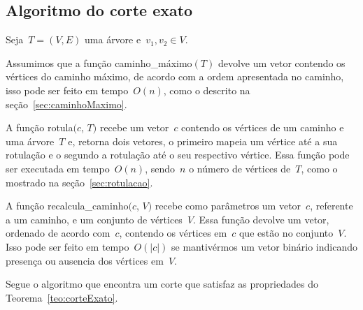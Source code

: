 	\bigskip
	\bigskip
	\bigskip
	\bigskip
	\bigskip

	\subsection{Algoritmo do corte exato}

		Seja~${T=(V,E)}$ uma árvore e~${v_1,v_2\in V}$.

		Assumimos que a função {\sc caminho\_máximo}$(T)$ 
		devolve um vetor contendo os vértices do caminho 
		máximo, de acordo com a ordem apresentada no caminho, 
		isso pode ser feito em tempo~$O(n)$, como o descrito na 
		seção~\ref{sec:caminhoMaximo}.

		A função {\sc rotula}$(c$, $T)$ recebe um vetor~$c$
		contendo os vértices de um caminho e uma árvore~$T$
		e, retorna dois vetores, o primeiro mapeia um vértice até 
		a sua rotulação e o segundo a rotulação até o seu respectivo
		vértice. 
		Essa função pode ser executada em tempo~$O(n)$, sendo~$n$
		o número de vértices de~$T$, como o mostrado na 
		seção~\ref{sec:rotulacao}.

		A função {\sc recalcula\_caminho}$(c$, $V)$
		recebe como parâmetros um vetor~$c$, referente a um 
		caminho, e um conjunto de vértices~$V$. Essa função devolve
		um vetor, ordenado de acordo com~$c$, contendo os 
		vértices em~$c$ que estão no conjunto~$V$. 
		Isso pode ser feito em tempo~$O(|c|)$ se mantivérmos um 
		vetor binário indicando presença ou ausencia dos vértices 
		em~$V$.




		Segue o algoritmo que encontra um corte que satisfaz as 
		propriedades do Teorema~\ref{teo:corteExato}.
		

